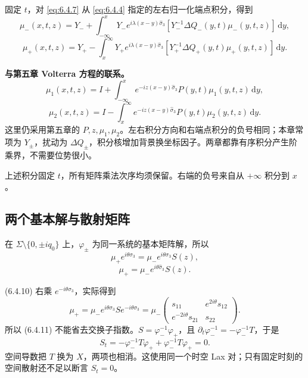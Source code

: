 \documentclass[lang=cn,scheme=chinese,mode=simple,device=normal,color=blue,
math=cm,thmcnt=section,12pt]{elegantbook}
\newcommand{\dd}{\,\mathrm{d}}
\newcommand{\eqq}[2]{\tag{#1}\label{eq:#1}#2}
\begin{document}
固定 $t$，对 \eqref{eq:6.4.7} 从 \eqref{eq:6.4.4} 指定的左右归一化端点积分，得到
\begin{equation}
    \eqq{6.4.8}{\mu_-(x,t,z)=Y_-+\int_{-\infty}^x
        Y_-e^{i\lambda(x-y)\widehat\sigma_3}[Y_-^{-1}\Delta Q_-(y,t)\mu_-(y,t,z)]\dd y,}
\end{equation}
\begin{equation}
    \eqq{6.4.9}{\mu_+(x,t,z)=Y_+-\int_x^\infty
        Y_+e^{i\lambda(x-y)\widehat\sigma_3}[Y_+^{-1}\Delta Q_+(y,t)\mu_+(y,t,z)]\dd y.}
\end{equation}

\label{sec:compare-volterra}
\begin{remark}\quad\textbf{与第五章 Volterra 方程的联系。}
    \begin{equation}
        \mu_1(x,t,z)
        =
        I+
        \int_{-\infty}^{x}
        e^{-iz(x-y)\widehat{\sigma}_3}
        P(y,t)\mu_1(y,t,z)\,\mathrm dy,
        \tag{5.2.1}
    \end{equation}
    \begin{equation}
        \mu_2(x,t,z)
        =
        I-
        \int_x^{\infty}
        e^{-iz(x-y)\widehat{\sigma}_3}
        P(y,t)\mu_2(y,t,z)\,\mathrm dy.
        \tag{5.2.2}
    \end{equation}
    这里仍采用第五章的 $P,z,\mu_1,\mu_2$。左右积分方向和右端点积分的负号相同；本章常项为 $Y_\pm$，扰动为 $\Delta Q_\pm$，积分核增加背景换坐标因子。两章都靠有序积分产生阶乘界，不需要位势很小。
\end{remark}


上述积分固定 $t$，所有矩阵乘法次序均须保留。右端的负号来自从 $+\infty$ 积分到 $x$。

\subsection{两个基本解与散射矩阵}
在 $\Sigma\setminus\{0,\pm iq_0\}$ 上，$\varphi_\pm$ 为同一系统的基本矩阵解，所以
\begin{equation}\eqq{6.4.10}{\mu_+e^{i\theta\sigma_3}=\mu_-e^{i\theta\sigma_3}S(z),}\end{equation}
\begin{equation}\eqq{6.4.11}{\mu_+=\mu_-e^{i\theta\widehat\sigma_3}S(z).}\end{equation}

\begin{callout}[计算：散射关系的相位与两个流中的常数性]
    (6.4.10) 右乘 $e^{-i\theta\sigma_3}$，实际得到
    \[
        \mu_+=\mu_-e^{i\theta\sigma_3}S e^{-i\theta\sigma_3}
        =\mu_-\begin{pmatrix}s_{11}&e^{2i\theta}s_{12}\\e^{-2i\theta}s_{21}&s_{22}\end{pmatrix}.
    \]
    所以 (6.4.11) 不能省去交换子指数。$S=\varphi_-^{-1}\varphi_+$，且 $\partial_t\varphi_-^{-1}=-\varphi_-^{-1}T$，于是
    \[
        S_t=-\varphi_-^{-1}T\varphi_++\varphi_-^{-1}T\varphi_+=0.
    \]
    空间导数把 $T$ 换为 $X$，两项也相消。这使用同一个时空 Lax 对；只有固定时刻的空间散射还不足以断言 $S_t=0$。
\end{callout}
\end{document}
